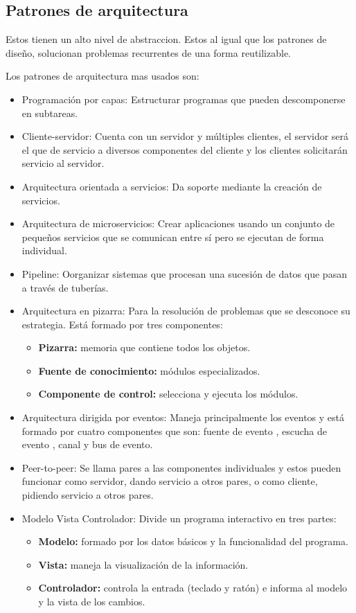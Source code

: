 \documentclass[12pt]{report} %
\begin{document}
 \subsection{Patrones de arquitectura}
 Estos tienen un alto nivel de abstraccion. Estos al igual que los patrones de diseño, solucionan problemas recurrentes de una forma reutilizable.
 
 Los patrones de arquitectura mas usados son:
 	\begin{itemize}
 	\item Programación por capas: Estructurar programas que pueden descomponerse en subtareas. 
 	\item Cliente-servidor: Cuenta con un servidor y múltiples clientes, el servidor será el que de servicio a diversos componentes del cliente y los clientes solicitarán servicio al servidor.
 	\item Arquitectura orientada a servicios: Da soporte mediante la creación de servicios. 
 	\item Arquitectura de microservicios: Crear aplicaciones usando un conjunto de pequeños servicios que se comunican entre sí pero se ejecutan de forma individual.
 	\item Pipeline: Oorganizar sistemas que procesan una sucesión de datos que pasan a través de tuberías.
 	\item Arquitectura en pizarra: Para la resolución de problemas que se desconoce su estrategia. Está formado por tres componentes:
 	\begin{itemize}
 		\item \textbf{Pizarra:} memoria que contiene todos los objetos. 
 		\item \textbf{Fuente de conocimiento:} módulos especializados. 
 		\item \textbf{Componente de control:} selecciona y ejecuta los módulos.
 	\end{itemize}
 	\item Arquitectura dirigida por eventos: Maneja principalmente los eventos y está formado por cuatro componentes que son: fuente de evento , escucha de evento , canal y bus de evento.
 	\item Peer-to-peer: Se llama pares a las componentes individuales y estos pueden funcionar como servidor, dando servicio a otros pares, o como cliente, pidiendo servicio a otros pares.
 	\item Modelo Vista Controlador: Divide un programa interactivo en tres partes:
 		\begin{itemize}
 			\item \textbf{Modelo:} formado por los datos básicos y la funcionalidad del programa. 
 			\item \textbf{Vista:} maneja la visualización de la información. 
 			\item \textbf{Controlador:} controla la entrada (teclado y ratón) e informa al modelo y la vista de los cambios.
 		\end{itemize}
 
 \end{itemize}
\end{document}
